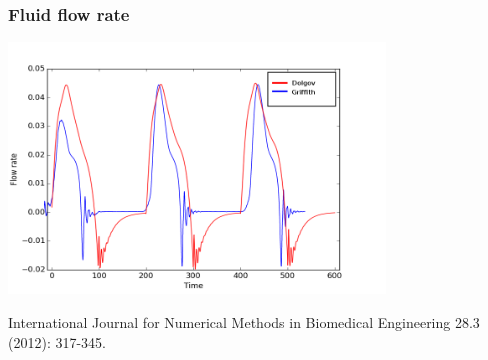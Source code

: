 \documentclass[14pt]{beamer}
\begin{document}

\begin{frame}
\frametitle{Fluid flow rate}
    \begin{center}
        \includegraphics[width=10cm]{flow_rate_comparison_with_legend.png}
    \end{center}

    \begin{adjustbox}{max totalsize={1.0\textwidth}{.7\textheight},center}
        {\scriptsize
            International Journal for Numerical Methods in Biomedical Engineering 28.3 (2012): 317-345.
        }
    \end{adjustbox}
\end{frame}
\end{document}

